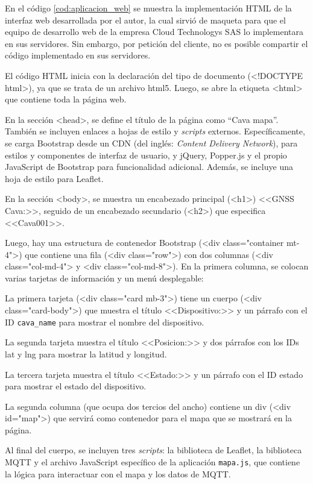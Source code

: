 En el código \ref{cod:aplicacion_web} se muestra la implementación HTML de la interfaz web desarrollada por el autor, la cual sirvió de maqueta para que el equipo de desarrollo web de la empresa Cloud Technologys SAS lo implementara en sus servidores. Sin embargo, por petición del cliente, no es posible compartir el código implementado en sus servidores. 

El código HTML inicia con la declaración del tipo de documento (<!DOCTYPE html>), ya que se trata de un archivo html5. Luego, se abre la etiqueta <html> que contiene toda la página web.

En la sección <head>, se define el título de la página como ``Cava mapa''. También se incluyen enlaces a hojas de estilo y \textit{scripts} externos. Específicamente, se carga Bootstrap desde un CDN (del inglés: \textit{Content Delivery Network}), para estilos y componentes de interfaz de usuario, y jQuery, Popper.js y el propio JavaScript de Bootstrap para funcionalidad adicional. Además, se incluye una hoja de estilo para Leaflet.

En la sección <body>, se muestra un encabezado principal (<h1>) <<GNSS Cava:>>, seguido de un encabezado secundario (<h2>) que especifica <<Cava001>>.

Luego, hay una estructura de contenedor Bootstrap (<div class="container mt-4">) que contiene una fila (<div class="row">) con dos columnas (<div class="col-md-4"> y <div class="col-md-8">). En la primera columna, se colocan varias tarjetas de información y un menú desplegable:

La primera tarjeta (<div class="card mb-3">) tiene un cuerpo (<div class="card-body">) que muestra el título <<Dispositivo:>> y un párrafo con el ID \verb|cava_name| para mostrar el nombre del dispositivo.

La segunda tarjeta muestra el título <<Posicion:>> y dos párrafos con los IDs lat y lng para mostrar la latitud y longitud.

La tercera tarjeta muestra el título <<Estado:>> y un párrafo con el ID estado para mostrar el estado del dispositivo.

La segunda columna (que ocupa dos tercios del ancho) contiene un div (<div id="map">) que servirá como contenedor para el mapa que se mostrará en la página.

Al final del cuerpo, se incluyen tres \textit{scripts}: la biblioteca de Leaflet, la biblioteca MQTT y el archivo JavaScript específico de la aplicación \verb|mapa.js|, que contiene la lógica para interactuar con el mapa y los datos de MQTT. 



